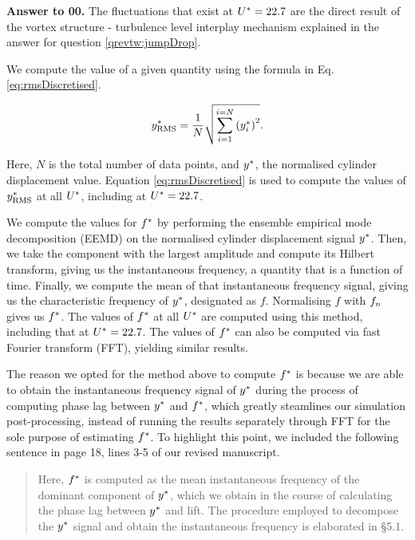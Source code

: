 \documentclass[10pt]{article}
\newcounter{question}
\newcommand{\name}{00}
\newcommand{\answer}[1]{\noindent \textbf{Answer to \name.\thequestion}\vskip 0.25cm \noindent #1 \mbox{}\\}
\begin{document}
\answer{
  \hspace*{-0.3cm} The fluctuations that exist at $U^{*} = 22.7$ are the direct result of the vortex structure - turbulence level interplay mechanism explained in the answer for question \ref{qrevtw:jumpDrop}.

  We compute the \rms{} value of a given quantity using the formula in Eq. \ref{eq:rmsDiscretised}.

  \begin{equation}
    y^{*}_{\text{RMS}} = \frac{1}{N} \sqrt{\sum_{i = 1}^{i = N} \left( y^{*}_{i} \right) ^{2}}.
    \label{eq:rmsDiscretised}
  \end{equation}

  \noindent Here, $N$ is the total number of data points, and $y^{*}$, the normalised cylinder displacement value. Equation \ref{eq:rmsDiscretised} is used to compute the values of $y^{*}_{\text{RMS}}$ at all $U^{*}$, including at $U^{*} = 22.7$.

  We compute the values for $f^{*}$ by performing the ensemble empirical mode decomposition (EEMD) on the normalised cylinder displacement signal $y^{*}$. Then, we take the component with the largest \rms{} amplitude and compute its Hilbert transform, giving us the instantaneous frequency, a quantity that is a function of time. Finally, we compute the mean of that instantaneous frequency signal, giving us the characteristic frequency of $y^{*}$, designated as $f$. Normalising $f$ with $f_{n}$ gives us $f^{*}$. The values of $f^{*}$ at all $U^{*}$ are computed using this method, including that at $U^{*} = 22.7$. The values of $f^{*}$ can also be computed via fast Fourier transform (FFT), yielding similar results.

  The reason we opted for the method above to compute $f^{*}$ is because we are able to obtain the instantaneous frequency signal of $y^{*}$ during the process of computing phase lag between $y^{*}$ and $f^{*}$, which greatly steamlines our simulation post-processing, instead of running the results separately through FFT for the sole purpose of estimating $f^{*}$. To highlight this point, we included the following sentence in page 18, lines 3-5 of our revised manuscript.
  
  \begin{quotation}
    \color{blue}
    \noindent Here, $f^{*}$ is computed as the mean instantaneous frequency of the dominant component of $y^{*}$, which we obtain in the course of calculating the phase lag between $y^{*}$ and lift. The procedure employed to decompose the $y^{*}$ signal and obtain the instantaneous frequency is elaborated in \S5.1.
    \color{black}
  \end{quotation}
}
\end{document}
